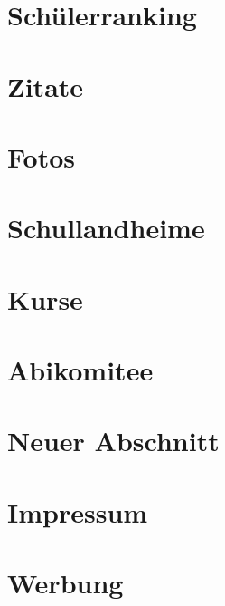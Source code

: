 \documentclass[a4paper, 13pt]{article}
\begin{document}
\section{Schülerranking}
\newpage

\section{Zitate}
\newpage

\section{Fotos}
\newpage

\section{Schullandheime}
\newpage

\section{Kurse}
\newpage

\section{Abikomitee}
\newpage

\section{Neuer Abschnitt}
\newpage

\section{Impressum}
\newpage

\section{Werbung}
\newpage
\end{document}
